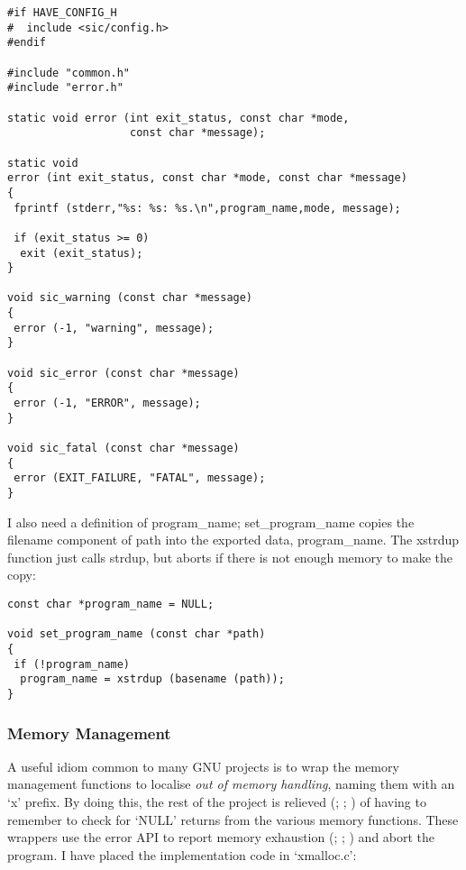 \begin{Verbatim}[frame=single]
#if HAVE_CONFIG_H
#  include <sic/config.h>
#endif

#include "common.h"
#include "error.h"

static void error (int exit_status, const char *mode, 
                   const char *message);

static void
error (int exit_status, const char *mode, const char *message)
{
 fprintf (stderr,"%s: %s: %s.\n",program_name,mode, message);

 if (exit_status >= 0)
  exit (exit_status);
}

void sic_warning (const char *message)
{
 error (-1, "warning", message);
}

void sic_error (const char *message)
{
 error (-1, "ERROR", message);
}

void sic_fatal (const char *message)
{
 error (EXIT_FAILURE, "FATAL", message);
}
\end{Verbatim}

I also need a definition of program\_{}name; set\_{}program\_{}name 
copies the filename component of path into the exported data, program\_{}name.
The xstrdup function just calls strdup, but aborts if there is not enough 
memory to make the copy: 

\begin{Verbatim}[frame=single]
const char *program_name = NULL;

void set_program_name (const char *path)
{
 if (!program_name)
  program_name = xstrdup (basename (path));
}
\end{Verbatim}

\subsubsection{Memory Management}\label{mm}

A useful idiom common to many GNU projects is to wrap the memory management 
functions to localise \textit{out of memory handling}, naming them with 
an `x' prefix. By doing this, the rest of the project is relieved ({\MbQ{}}; {\MbQ{}};
{\McQ{}}) of having to remember to check for `NULL' returns from the various 
memory functions. These wrappers use the error API to report memory 
exhaustion ({\MiQ{}}; {\MgQ{}}; {\McQ{}}) and abort the program. I have placed the 
implementation code in `xmalloc.c': 

